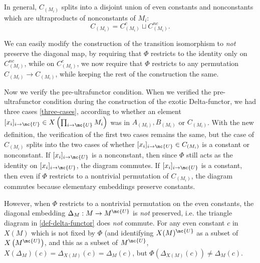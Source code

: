 In general, $C_{(M_i)}$ splits into a disjoint union of even constants and nonconstants which are ultraproducts of nonconstants of $M_i$: $$C_{(M_i)} = C_{(M_i)}^c \sqcup C_{(M_i)}^{nc}.$$

We can easily modify the construction of the transition isomorphism to \emph{not} preserve the diagonal map, by requiring that $\Phi$ restricts to the identity only on $C_{(M_i)}^{nc}$, while on $C_{(M_i)}^c$, we now require that $\Phi$ restricts to any permutation $C_{(M_i)} \to C_{(M_i)}$, while keeping the rest of the construction the same.

Now we verify the pre-ultrafunctor condition. When we verified the pre-ultrafunctor condition during the construction of the exotic Delta-functor, we had three cases \ref{three-cases}, according to whether an element $[x_i]_{i \to \mc{U}} \in X \left( \prod_{i \to \mc{U}} M_i \right)$ was in $A_{(M_i)}, B_{(M_i)}$ or $C_{(M_i)}$. With the new definition, the verification of the first two cases remains the same, but the case of $C_{(M_i)}$ splits into the two cases of whether $[x_i]_{i \to \mc{U}} \in C_{(M_i)}$ is a constant or nonconstant. If $[x_i]_{i \to \mc{U}}$ is a nonconstant, then since $\Phi$ still acts as the identity on $[x_i]_{i \to \mc{U}}$, the diagram commutes. If $[x_i]_{i \to \mc{U}}$ is a constant, then even if $\Phi$ restricts to a nontrivial permutation of $C_{(M_i)}$, the diagram commutes because elementary embeddings preserve constants.

However, when $\Phi$ restricts to a nontrivial permutation on the even constants, the diagonal embedding $\Delta_M : M \to M^{\mc{U}}$ is \emph{not} preserved, i.e. the triangle diagram in \ref{def-delta-functor} does \emph{not} commute. For any even constant $c$ in $X(M)$ which is not fixed by $\Phi$ (and identifying $X(M)^{\mc{U}}$ as a subset of $X\left(M^{\mc{U}}\right)$, and this as a subset of $M^{\mc{U}}$, $X(\Delta_M)(c)= \Delta_{X(M)}(c) = \Delta_M(c)$, but $\Phi(\Delta_{X(M)}(c)) \neq \Delta_{M}(c)$. 
  


